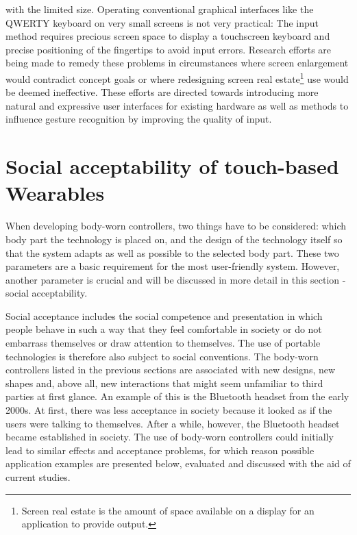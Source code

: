 \documentclass{sigchi}
\begin{document}
with the limited size. Operating conventional graphical interfaces like the QWERTY keyboard on very small screens is not very practical: The input method requires precious screen space to display a touchscreen keyboard and precise positioning of the fingertips to avoid input errors. \cite{vogel7} Research efforts are being made to remedy these problems in circumstances where screen enlargement would contradict concept goals or where redesigning screen real estate\footnote{Screen real estate is the amount of space available on a display for an application to provide output. } %
use would  be deemed ineffective. These efforts are directed towards introducing more natural and expressive user interfaces for existing hardware as well as methods to influence gesture recognition by improving the quality of input. \cite{motion-ui, vogel7} %



\section{Social acceptability of touch-based Wearables}
When developing body-worn controllers, two things have to be considered: which body part the technology is placed on, and the design of the technology itself so that the system adapts as well as possible to the selected body part. These two parameters are a basic requirement for the most user-friendly system. \cite{touch-wrist} However, another parameter is crucial and will be discussed in more detail in this section - social acceptability.

Social acceptance includes the social competence and presentation in which people behave in such a way that they feel comfortable in society or do not embarrass themselves or draw attention to themselves. \cite{self-everyday} The use of portable technologies is therefore also subject to social conventions. The body-worn controllers listed in the previous sections are associated with new designs, new shapes and, above all, new interactions that might seem unfamiliar to third parties at first glance.
An example of this is the Bluetooth headset from the early 2000s. At first, there was less acceptance in society because it looked as if the users were talking to themselves. After a while, however, the Bluetooth headset became established in society. \cite{usable-gesture} The use of body-worn controllers could initially lead to similar effects and acceptance problems, for which reason possible application examples are presented below, evaluated and discussed with the aid of current studies.
\end{document}

